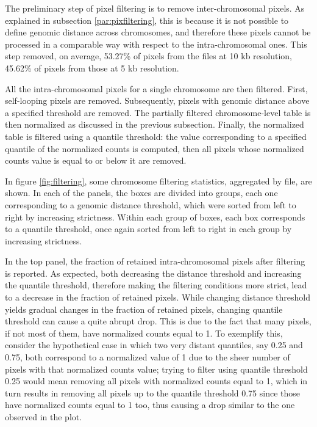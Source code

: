 The preliminary step of pixel filtering is to remove inter-chromosomal pixels. As explained in subsection \ref{par:pixfiltering}, this is because it is not possible to define genomic distance across chromosomes, and therefore these pixels cannot be processed in a comparable way with respect to the intra-chromosomal ones. This step removed, on average, 53.27\% of pixels from the files at 10 kb resolution, 45.62\% of pixels from those at 5 kb resolution.

All the intra-chromosomal pixels for a single chromosome are then filtered. First, self-looping pixels are removed. Subsequently, pixels with genomic distance above a specified threshold are removed. The partially filtered chromosome-level table is then normalized as discussed in the previous subsection. Finally, the normalized table is filtered using a quantile threshold: the value corresponding to a specified quantile of the normalized counts is computed, then all pixels whose normalized counts value is equal to or below it are removed.

In figure \ref{fig:filtering}, some chromosome filtering statistics, aggregated by file, are shown. In each of the panels, the boxes are divided into groups, each one corresponding to a genomic distance threshold, which were sorted from left to right by increasing strictness. Within each group of boxes, each box corresponds to a quantile threshold, once again sorted from left to right in each group by increasing strictness.

In the top panel, the fraction of retained intra-chromosomal pixels after filtering is reported. As expected, both decreasing the distance threshold and increasing the quantile threshold, therefore making the filtering conditions more strict, lead to a decrease in the fraction of retained pixels. While changing distance threshold yields gradual changes in the fraction of retained pixels, changing quantile threshold can cause a quite abrupt drop. This is due to the fact that many pixels, if not most of them, have normalized counts equal to 1. To exemplify this, consider the hypothetical case in which two very distant quantiles, say 0.25 and 0.75, both correspond to a normalized value of 1 due to the sheer number of pixels with that normalized counts value; trying to filter using quantile threshold 0.25 would mean removing all pixels with normalized counts equal to 1, which in turn results in removing all pixels up to the quantile threshold 0.75 since those have normalized counts equal to 1 too, thus causing a drop similar to the one observed in the plot.

